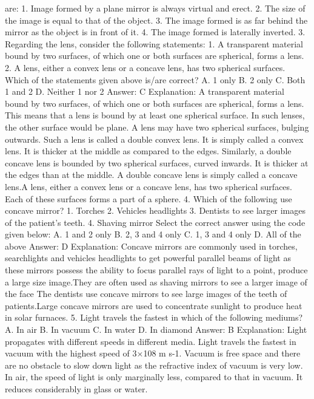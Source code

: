 are:
1. Image formed by a plane mirror is always virtual and erect.
2. The size of the image is equal to that of the object.
3. The image formed is as far behind the mirror as the object is in
front of it.
4. The image formed is laterally inverted.
3. Regarding the lens, consider the following statements:
1. A transparent material bound by two surfaces, of which one or
both surfaces are spherical, forms a lens.
2. A lens, either a convex lens or a concave lens, has two spherical
surfaces.
Which of the statements given above is/are correct?
A. 1 only
B. 2 only
C. Both 1 and 2
D. Neither 1 nor 2
Answer: C
Explanation:
A transparent material bound by two surfaces, of which one or both
surfaces are spherical, forms a lens. This means that a lens is bound
by at least one spherical surface. In such lenses, the other surface
would be plane.
A lens may have two spherical surfaces, bulging outwards. Such a
lens is called a double convex lens. It is simply called a convex lens.
It is thicker at the middle as compared to the edges.
Similarly, a double concave lens is bounded by two spherical
surfaces, curved inwards. It is thicker at the edges than at the
middle. A double concave lens is simply called a concave lens.A lens,
either a convex lens or a concave lens, has two spherical surfaces.
Each of these surfaces forms a part of a sphere.
4. Which of the following use concave mirror?
1. Torches
2. Vehicles headlights
3. Dentists to see larger images of the patient's teeth.
4. Shaving mirror
Select the correct answer using the code given below:
A. 1 and 2 only
B. 2, 3 and 4 only
C. 1, 3 and 4 only
D. All of the above
Answer: D
Explanation:
Concave mirrors are commonly used in torches, searchlights and
vehicles headlights to get powerful parallel beams of light as these
mirrors possess the ability to focus parallel rays of light to a point,
produce a large size image.They are often used as shaving mirrors to
see a larger image of the face The dentists use concave mirrors to
see large images of the teeth of patients.Large concave mirrors are
used to concentrate sunlight to produce heat in solar furnaces.
5. Light travels the fastest in which of the following mediums?
A. In air
B. In vacuum
C. In water
D. In diamond
Answer: B
Explanation: Light propagates with different speeds in different
media.
Light travels the fastest in vacuum with the highest speed of
3×108 m s-1. Vacuum is free space and there are no obstacle to slow
down light as the refractive index of vacuum is very low.
In air, the speed of light is only marginally less, compared to that in
vacuum.
It reduces considerably in glass or water.
